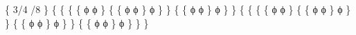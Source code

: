 \{ 3/4 /8 \}
\{ \{ \{ \{ ϕ \mid ϕ \} \mid \{ \{ ϕ \mid ϕ \} \mid ϕ \} \} \mid \{ \{ ϕ \mid ϕ \} \mid ϕ \} \} \mid \{ \{ \{ \{ ϕ \mid ϕ \} \mid \{ \{ ϕ \mid ϕ \} \mid ϕ \} \} \mid \{ \{ ϕ \mid ϕ \} \mid ϕ \} \} \mid \{ \{ ϕ \mid ϕ \} \mid ϕ \} \} \}
